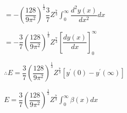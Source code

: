 \documentclass{jarticle}%
\begin{document}
$=-\left(  \dfrac{128}{9\pi^{2}}\right)  ^{\frac{1}{3}}\dfrac{3}{7}Z^{\frac
{7}{3}}%
{\displaystyle\int_{0}^{\infty}}
\dfrac{d^{2}y\left(  x\right)  }{dx^{2}}dx$

$=-\dfrac{3}{7}\left(  \dfrac{128}{9\pi^{2}}\right)  ^{\frac{1}{3}}Z^{\frac
{7}{3}}\left[  \dfrac{dy\left(  x\right)  }{dx}\right]  _{0}^{\infty}$

$\therefore E=\dfrac{3}{7}\left(  \dfrac{128}{9\pi^{2}}\right)  ^{\frac{1}{3}%
}Z^{\frac{7}{3}}\left[  y^{\prime}\left(  0\right)  -y^{\prime}\left(
\infty\right)  \right]  $

$E=\dfrac{3}{7}\left(  \dfrac{128}{9\pi^{2}}\right)  ^{\frac{1}{3}}Z^{\frac
{7}{3}}%
{\displaystyle\int_{0}^{\infty}}
\beta\left(  x\right)  dx$
\end{document}
